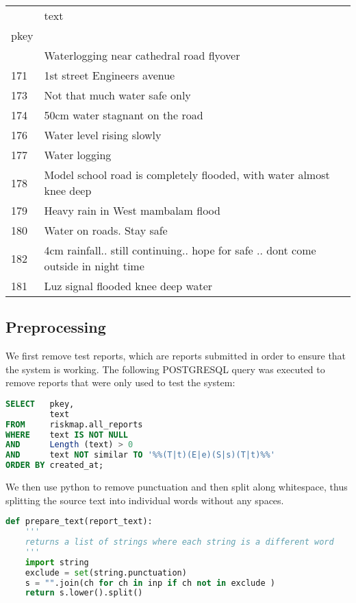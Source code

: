 \label{table:text_sample}
\begin{table}
  \begin{tabular}{ll}
    \toprule
    {} &
    text \\
    pkey &
    \\
    \hline{}
    \midrule
    169  &
    Waterlogging near cathedral road flyover  \\
    171  &
    1st street Engineers avenue \\
    173  &
    Not that much water safe only \\
    174  &
    50cm water stagnant on the road \\
    176  &
    Water level rising  slowly  \\
    177  &
    Water logging  \\
    178  &
    Model school road is completely flooded, with water almost knee deep \\
    179  &
    Heavy rain in West mambalam flood \\
    180  &
    Water on roads. Stay safe \\
    182  &                                                           4cm
    rainfall.. still continuing.. hope for safe .. dont come outside in
    night time \\
    181  &
    Luz signal flooded knee deep water \\
    \bottomrule
  \end{tabular}
\end{table}

\subsection{Preprocessing}
We first remove test reports, which are reports submitted in order to ensure
that the system is working. The following POSTGRESQL query was executed to remove
reports that were only used to test the system:

\begin{lstlisting}[language=SQL]
SELECT   pkey,
         text
FROM     riskmap.all_reports
WHERE    text IS NOT NULL
AND      Length (text) > 0
AND      text NOT similar TO '%%(T|t)(E|e)(S|s)(T|t)%%'
ORDER BY created_at;
\end{lstlisting}

We then use python to remove punctuation and then split along whitespace, thus
splitting the source text into individual words without any spaces.

\begin{lstlisting}[language=python]
def prepare_text(report_text):
    '''
    returns a list of strings where each string is a different word
    '''
    import string
    exclude = set(string.punctuation)
    s = "".join(ch for ch in inp if ch not in exclude )
    return s.lower().split()
\end{lstlisting}

